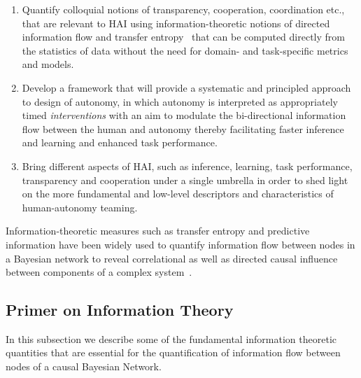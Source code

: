 \documentclass[12pt]{article}
\begin{document}
\begin{enumerate}
	\item Quantify colloquial notions of transparency, cooperation, coordination etc., that are relevant to HAI using information-theoretic notions of directed information flow and transfer entropy~\cite{schreiber2000measuring} that can be computed directly from the statistics of data without the need for domain- and task-specific metrics and models. 
	
	\item Develop a framework that will provide a systematic and principled approach to design of autonomy, in which autonomy is interpreted as appropriately timed \textit{interventions} with an aim to modulate the bi-directional information flow between the human and autonomy thereby facilitating faster inference and learning and enhanced task performance.
	
	\item Bring different aspects of HAI, such as inference, learning, task performance, transparency and cooperation under a single umbrella in order to shed light on the more fundamental and low-level descriptors and characteristics of human-autonomy teaming. 
\end{enumerate}
Information-theoretic measures such as transfer entropy and predictive information have been widely used to quantify information flow between nodes in a Bayesian network to reveal correlational as well as directed causal influence between components of a complex system~\cite{ay2008information}.
%
%
%
\subsection{Primer on Information Theory}
In this subsection we describe some of the fundamental information theoretic quantities that are essential for the quantification of information flow between nodes of a causal Bayesian Network. 
\end{document}
